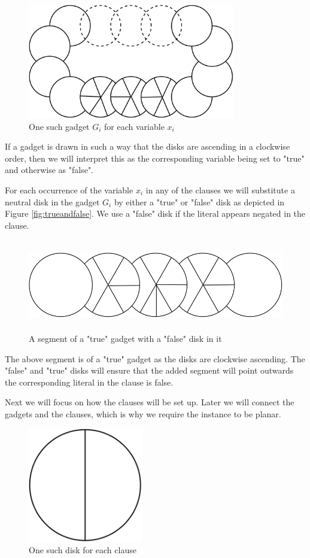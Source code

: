 \documentclass[a4paper,11pt]{article}
\begin{document}
\begin{figure}[H]
  \centering
  \includegraphics[height=5cm]{assets/np-hardness/gadget.png}
  \caption{One such gadget $G_i$ for each variable $x_i$}
  \label{fig:gadget}
\end{figure}

If a gadget is drawn in such a way that the disks are ascending in a clockwise order, then we will interpret this as the corresponding variable being set to "true" and otherwise as "false".

For each occurrence of the variable $x_i$ in any of the clauses we will substitute a neutral disk in the gadget $G_i$ by either a "true" or "false" disk as depicted in Figure \ref{fig:trueandfalse}. We use a "false" disk if the literal appears negated in the clause.

\begin{figure}[h]
  \centering
  \includegraphics[height=4cm]{assets/np-hardness/negative.png}
  \caption{A segment of a "true" gadget with a "false" disk in it}
\end{figure}

The above segment is of a "true" gadget as the disks are clockwise ascending. The "false" and "true" disks will ensure that the added segment will point outwards the corresponding literal in the clause is false.

Next we will focus on how the clauses will be set up. Later we will connect the gadgets and the clauses, which is why we require the instance to be planar.

\begin{figure}[H]
  \centering
  \includegraphics[height=5cm]{assets/np-hardness/clause.png}
  \caption{One such disk for each clause}
  \label{fig:clausedisk}
\end{figure}
\end{document}
